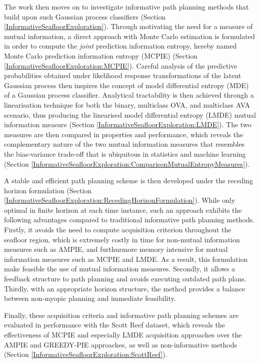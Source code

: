		The work then moves on to investigate informative path planning methods that build upon such Gaussian process classifiers (Section \ref{InformativeSeafloorExploration}). Through motivating the need for a measure of mutual information, a direct approach with Monte Carlo estimation is formulated in order to compute the \textit{joint} prediction information entropy, hereby named Monte Carlo prediction information entropy (MCPIE) (Section \ref{InformativeSeafloorExploration:MCPIE}). Careful analysis of the predictive probabilities obtained under likelihood response transformations of the latent Gaussian process then inspires the concept of model differential entropy (MDE) of a Gaussian process classifier. Analytical tractability is then achieved through a linearisation technique for both the binary, multiclass OVA, and multiclass AVA scenario, thus producing the linearised model differential entropy (LMDE) mutual information measure (Section \ref{InformativeSeafloorExploration:LMDE}). The two measures are then compared in properties and performance, which reveals the complementary nature of the two mutual information measures that resembles the bias-variance trade-off that is ubiquitous in statistics and machine learning (Section \ref{InformativeSeafloorExploration:ComparisonMutualEntropyMeasures}).
		
		A stable and efficient path planning scheme is then developed under the receding horizon formulation (Section \ref{InformativeSeafloorExploration:RecedingHorizonFormulation}). While only optimal in finite horizon at each time instance, such an approach exhibits the following advantages compared to traditional informative path planning methods. Firstly, it avoids the need to compute acquisition criterion throughout the seafloor region, which is extremely costly in time for non-mutual information measures such as AMPIE, and furthurmore memory intensive for mutual information measures such as MCPIE and LMDE. As a result, this formulation make feasible the use of mutual information measures. Secondly, it allows a feedback structure to path planning and avoids executing outdated path plans. Thirdly, with an appropriate horizon structure, the method provides a balance between non-myopic planning and immediate feasibility.
		
		Finally, these acquisition criteria and informative path planning schemes are evaluated in performance with the Scott Reef dataset, which reveals the effectiveness of MCPIE and especially LMDE acquisition approaches over the AMPIE and GREEDY-PIE approaches, as well as non-informative methods (Section \ref{InformativeSeafloorExploration:ScottReef}).
	
